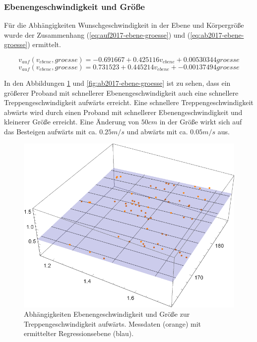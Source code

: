 \subsubsection{Ebenengeschwindigkeit und Größe}

Für die Abhängigkeiten Wunschgeschwindigkeit in der Ebene und Körpergröße wurde 
der Zusammenhang (\ref{eq:auf2017-ebene-groesse}) und (\ref{eq:ab2017-ebene-groesse}) ermittelt.

\begin{equation} \label{eq:auf2017-ebene-groesse}
	v_{auf}(v_{ebene}, groesse) = -0.691667 + 0.425116 v_{ebene} + 0.00530344 groesse
\end{equation}
\begin{equation} \label{eq:ab2017-ebene-groesse}
	v_{auf}(v_{ebene}, groesse) = 0.731523 + 0.445214 v_{ebene} + -0.00137494 groesse
\end{equation}

In den Abbildungen \ref{fig:auf2017-ebene-groesse} und \ref{fig:ab2017-ebene-groesse} ist 
zu sehen, dass ein größerer Proband mit schnellerer Ebenengeschwindigkeit auch eine schnellere Treppengeschwindigkeit aufwärts erreicht. Eine schnellere Treppengeschwindigkeit abwärts wird durch einen Proband mit schnellerer Ebenengeschwindigkeit und kleinerer Größe erreicht. Eine Änderung von $50 cm$ in der Größe wirkt sich auf das Besteigen aufwärts mit ca. $0.25 m/s$ und abwärts mit ca. $0.05 m/s$ aus.

\begin{figure} \centering 
	\includegraphics[]{abbildungen/regression/2017/auf-ebene-groesse.pdf}
	
	\caption{Abhängigkeiten Ebenengeschwindigkeit und Größe zur Treppengeschwindigkeit aufwärts. Messdaten (orange) mit ermittelter Regressionsebene (blau). \label{fig:auf2017-ebene-groesse}}
\end{figure}

